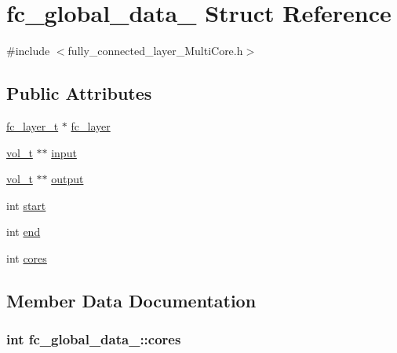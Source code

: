 \hypertarget{structfc__global__data__}{}\section{fc\+\_\+global\+\_\+data\+\_\+ Struct Reference}
\label{structfc__global__data__}


{\ttfamily \#include $<$fully\+\_\+connected\+\_\+layer\+\_\+\+Multi\+Core.\+h$>$}

\subsection*{Public Attributes}
\begin{DoxyCompactItemize}
\item 
\hyperlink{fully__connected__layer_8h_acda77f28c85b289bb787d3c78e0c51aa}{fc\+\_\+layer\+\_\+t} $\ast$ \hyperlink{structfc__global__data___acc7f1357fa20bbbf814f38cf3cb9f106}{fc\+\_\+layer}
\item 
\hyperlink{data__structure_8h_a051bd2b17d42e70d86b4314e0dd8881e}{vol\+\_\+t} $\ast$$\ast$ \hyperlink{structfc__global__data___a4407f1e83b72f8846d23aa2e1bfca7e7}{input}
\item 
\hyperlink{data__structure_8h_a051bd2b17d42e70d86b4314e0dd8881e}{vol\+\_\+t} $\ast$$\ast$ \hyperlink{structfc__global__data___acc58974b2b758390a192abdb06a8a615}{output}
\item 
int \hyperlink{structfc__global__data___a5d019756d3bb4fb37e2a125f1f3b551b}{start}
\item 
int \hyperlink{structfc__global__data___a5924178156d04cd1c7c79ca5ce07e653}{end}
\item 
int \hyperlink{structfc__global__data___a659485b762c3fb93b430e937150ba0a9}{cores}
\end{DoxyCompactItemize}


\subsection{Member Data Documentation}
\subsubsection[{cores}]{\setlength{\rightskip}{0pt plus 5cm}int fc\+\_\+global\+\_\+data\+\_\+\+::cores}\hypertarget{structfc__global__data___a659485b762c3fb93b430e937150ba0a9}{}\label{structfc__global__data___a659485b762c3fb93b430e937150ba0a9}
